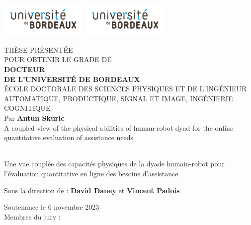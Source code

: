 \documentclass[french,12pt,a4paper]{report}
\begin{document}
\pagestyle{empty}
\includegraphics[scale=1, height=1.7cm]{first_page/brdx.pdf}
\hfill
\includegraphics[scale=1, height=1.7cm]{first_page/brdx.pdf}
\hfill
\begin{center}
\doublespacing
\begin{Large}

THÈSE PRÉSENTÉE\\ POUR OBTENIR LE GRADE DE \\
{\LARGE \textbf{DOCTEUR\\DE L'UNIVERSITÉ DE BORDEAUX} } \\
\vspace{0.55cm}
ÉCOLE DOCTORALE DES SCIENCES PHYSIQUES ET DE L’INGÉNIEUR \\
{\small AUTOMATIQUE, PRODUCTIQUE, SIGNAL ET IMAGE, INGÉNIERIE COGNITIQUE} \\
\vspace{0.35cm}
Par \textbf{Antun Skuric} \\
\vspace{0.35cm}
{\Large {A coupled view of the physical abilities of human-robot dyad for the
online quantitative evaluation of assistance needs}}
\end{Large}\\
\vspace{0.15cm}
{\normalsize Une vue couplée des capacités physiques de la dyade humain-robot pour l'évaluation quantitative en ligne des besoins d'assistance}
\vspace{0.55cm}
\begin{normalsize}
\begin{singlespace}
Sous la direction de : \textbf{David Daney} et  \textbf{Vincent Padois}
\end{singlespace}
\end{normalsize}
\end{center}
\vfill
{\large Soutenance le 6 novembre 2023 }\\
\vfill
Membres du jury :
\end{document}
